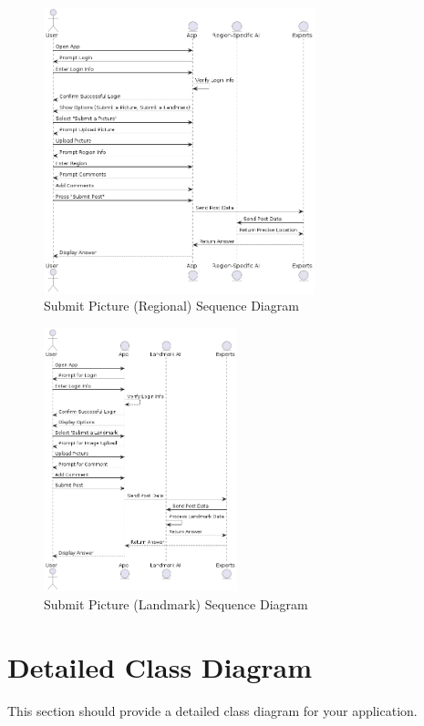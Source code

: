 \documentclass[]{article}
\begin{document}
\begin{figure}[H]
    \centering
    \includegraphics[width=0.7\textwidth]{out/sequence4/sequence4.png} %
    \caption{Submit Picture (Regional) Sequence Diagram}
\end{figure}

\begin{figure}[H]
    \centering
    \includegraphics[width=0.5\textwidth]{out/sequence5/sequence5.png} %
    \caption{Submit Picture (Landmark) Sequence Diagram}
\end{figure}



\section{Detailed Class Diagram}
\label{sec:detailed_class_diagram}
This section should provide a detailed class diagram for your application.
\end{document}
